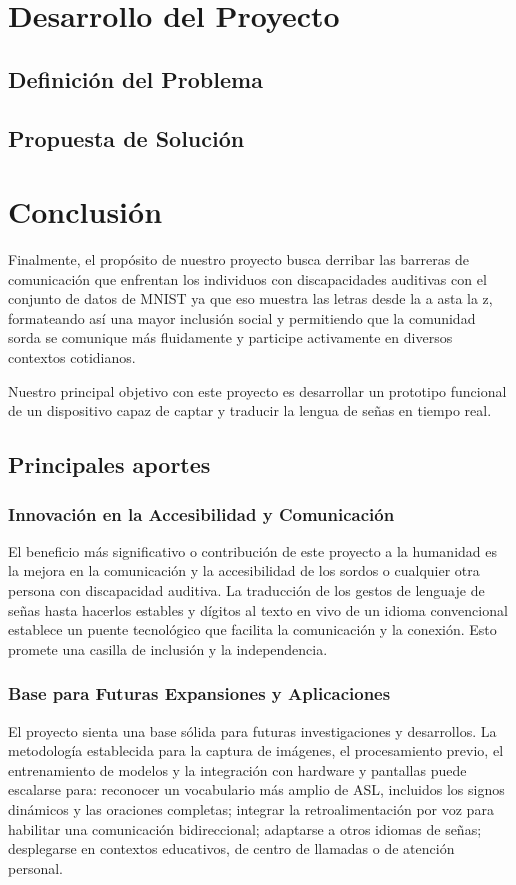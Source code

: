 \documentclass[letter,12pt]{report}
\begin{document}
\chapter{Desarrollo del Proyecto}


\section{Definición del Problema}


\section{Propuesta de Solución}




\chapter{Conclusión}
Finalmente, el propósito de nuestro proyecto busca derribar las barreras de comunicación que enfrentan los individuos con discapacidades auditivas con el conjunto de datos de MNIST ya que eso muestra las letras desde la a asta la z, formateando así una mayor inclusión social y permitiendo que la comunidad sorda se comunique más fluidamente y participe activamente en diversos contextos cotidianos. 

Nuestro principal objetivo con este proyecto es desarrollar un prototipo funcional de un dispositivo capaz de captar y traducir la lengua de señas en tiempo real.

\section{Principales aportes}
\subsection{Innovación en la Accesibilidad y Comunicación}
El beneficio más significativo o contribución de este proyecto a la humanidad es la mejora en la comunicación y la accesibilidad de los sordos o cualquier otra persona con discapacidad auditiva. La traducción de los gestos de lenguaje de señas hasta hacerlos estables y dígitos al texto en vivo de un idioma convencional establece un puente tecnológico que facilita la comunicación y la conexión. Esto promete una casilla de inclusión y la independencia.
\subsection{Base para Futuras Expansiones y Aplicaciones}
El proyecto sienta una base sólida para futuras investigaciones y desarrollos. La metodología establecida para la captura de imágenes, el procesamiento previo, el entrenamiento de modelos y la integración con hardware y pantallas puede escalarse para: reconocer un vocabulario más amplio de ASL, incluidos los signos dinámicos y las oraciones completas; integrar la retroalimentación por voz para habilitar una comunicación bidireccional; adaptarse a otros idiomas de señas; desplegarse en contextos educativos, de centro de llamadas o de atención personal.
\end{document}
